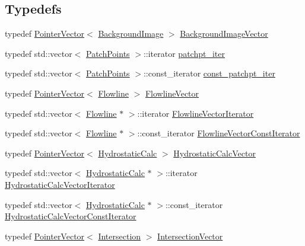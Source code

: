 \subsection*{Typedefs}
\begin{DoxyCompactItemize}
\item 
typedef \hyperlink{classPointerVector}{Pointer\+Vector}$<$ \hyperlink{classShipCAD_1_1BackgroundImage}{Background\+Image} $>$ \hyperlink{namespaceShipCAD_ac421659cf582dda585c31351043a79d3}{Background\+Image\+Vector}
\item 
typedef std\+::vector$<$ \hyperlink{structShipCAD_1_1PatchPoints}{Patch\+Points} $>$\+::iterator \hyperlink{namespaceShipCAD_a69b081dd347722fb55da2f3958db5d08}{patchpt\+\_\+iter}
\item 
typedef std\+::vector$<$ \hyperlink{structShipCAD_1_1PatchPoints}{Patch\+Points} $>$\+::const\+\_\+iterator \hyperlink{namespaceShipCAD_aea0ea62a5074a9ec5618bf822480b840}{const\+\_\+patchpt\+\_\+iter}
\item 
typedef \hyperlink{classPointerVector}{Pointer\+Vector}$<$ \hyperlink{classShipCAD_1_1Flowline}{Flowline} $>$ \hyperlink{namespaceShipCAD_a266f1cbe13c1087079b277baa825b85d}{Flowline\+Vector}
\item 
typedef std\+::vector$<$ \hyperlink{classShipCAD_1_1Flowline}{Flowline} $\ast$ $>$\+::iterator \hyperlink{namespaceShipCAD_adea57d928a6348cab7a6a452cca5853f}{Flowline\+Vector\+Iterator}
\item 
typedef std\+::vector$<$ \hyperlink{classShipCAD_1_1Flowline}{Flowline} $\ast$ $>$\+::const\+\_\+iterator \hyperlink{namespaceShipCAD_af5ce87bb0e3720999cde4b18b32aeca3}{Flowline\+Vector\+Const\+Iterator}
\item 
typedef \hyperlink{classPointerVector}{Pointer\+Vector}$<$ \hyperlink{classShipCAD_1_1HydrostaticCalc}{Hydrostatic\+Calc} $>$ \hyperlink{namespaceShipCAD_a0c7b012d8868cbb43871cf0bf303ccc6}{Hydrostatic\+Calc\+Vector}
\item 
typedef std\+::vector$<$ \hyperlink{classShipCAD_1_1HydrostaticCalc}{Hydrostatic\+Calc} $\ast$ $>$\+::iterator \hyperlink{namespaceShipCAD_a09b1b198129010214012a1cc49c98e28}{Hydrostatic\+Calc\+Vector\+Iterator}
\item 
typedef std\+::vector$<$ \hyperlink{classShipCAD_1_1HydrostaticCalc}{Hydrostatic\+Calc} $\ast$ $>$\+::const\+\_\+iterator \hyperlink{namespaceShipCAD_afd3fb43e1160083a9aee5f5d076abf43}{Hydrostatic\+Calc\+Vector\+Const\+Iterator}
\item 
typedef \hyperlink{classPointerVector}{Pointer\+Vector}$<$ \hyperlink{classShipCAD_1_1Intersection}{Intersection} $>$ \hyperlink{namespaceShipCAD_a9910f0963197f9df6125398efd4fa139}{Intersection\+Vector}

\end{DoxyCompactItemize}
